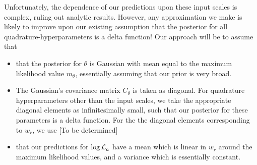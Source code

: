 \documentclass{article}
\begin{document}
Unfortunately, the dependence of our predictions upon these input scales is complex, ruling out analytic results. However, any approximation we make is likely to improve upon our existing assumption that the posterior for all quadrature-hyperparameters is a delta function! Our approach will be to assume that
\begin{itemize}
 \item that the posterior for $\theta$ is Gaussian with mean equal to the maximum likelihood value $m_\theta$, essentially assuming that our prior is very broad. 
\item The Gaussian's covariance matrix $C_\theta$ is taken as diagonal. For quadrature hyperparameters other than the input scales, we take the appropriate diagonal elements as infinitesimally small, such that our posterior for these parameters is a delta function. For the the diagonal elements corresponding to $w_r$, we use [To be determined]
\item that our predictions for $\tr_a$ have a mean which is linear in $w_r$ around the maximum likelihood values, and a variance which is essentially constant.  
\end{itemize}
 
\end{document}
